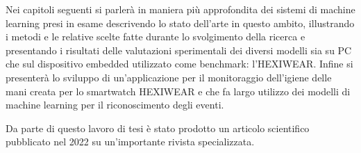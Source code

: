 Nei capitoli seguenti si parlerà in maniera più approfondita dei sistemi di machine learning presi in esame descrivendo lo stato dell'arte in questo ambito, illustrando i metodi e le relative scelte fatte durante lo svolgimento della ricerca e presentando i risultati delle valutazioni sperimentali dei diversi modelli sia su PC che sul dispositivo embedded utilizzato come benchmark: l'HEXIWEAR. Infine si presenterà lo sviluppo di un'applicazione per il monitoraggio dell'igiene delle mani creata per lo smartwatch HEXIWEAR e che fa largo utilizzo dei modelli di machine learning per il riconoscimento degli eventi.

Da parte di questo lavoro di tesi è stato prodotto un articolo scientifico pubblicato nel 2022 su un'importante rivista specializzata\cite{lattanzi2022unstructured}.
